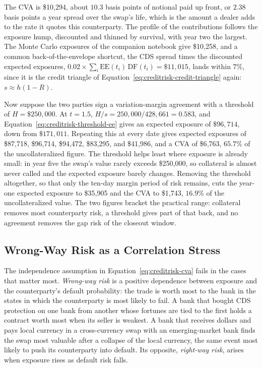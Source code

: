 \documentclass[../ai_in_finance]{subfiles}
\begin{document}
The CVA is \$10{,}294, about $10.3$ basis points of notional paid up front, or $2.38$ basis points a year spread over the swap's life, which is the amount a dealer adds to the rate it quotes this counterparty. The profile of the contributions follows the exposure hump, discounted and thinned by survival, with year two the largest. The Monte Carlo exposures of the companion notebook give \$10{,}258, and a common back-of-the-envelope shortcut, the CDS spread times the discounted expected exposures, $0.02 \times \sum_i \text{EE}(t_i)\,\text{DF}(t_i) = \$11{,}015$, lands within $7\%$, since it is the credit triangle of Equation~\eqref{eq:creditrisk-credit-triangle} again: $s \approx h(1-R)$.

Now suppose the two parties sign a variation-margin agreement with a threshold of $H = \$250{,}000$. At $t=1.5$, $H/s = 250{,}000/428{,}661 = 0.583$, and Equation~\eqref{eq:creditrisk-threshold-ee} gives an expected exposure of $\$96{,}714$, down from $\$171{,}011$. Repeating this at every date gives expected exposures of \$87{,}718, \$96{,}714, \$94{,}472, \$83{,}295, and \$41{,}986, and a CVA of \$6{,}763, $65.7\%$ of the uncollateralized figure. The threshold helps least where exposure is already small: in year five the swap's value rarely exceeds \$250{,}000, so collateral is almost never called and the expected exposure barely changes. Removing the threshold altogether, so that only the ten-day margin period of risk remains, cuts the year-one expected exposure to \$35{,}905 and the CVA to \$1{,}743, $16.9\%$ of the uncollateralized value. The two figures bracket the practical range: collateral removes most counterparty risk, a threshold gives part of that back, and no agreement removes the gap risk of the closeout window.

\subsection{Wrong-Way Risk as a Correlation Stress}
\label{sec:wrong-way-risk}

The independence assumption in Equation~\eqref{eq:creditrisk-cva} fails in the cases that matter most. \emph{Wrong-way risk} is a positive dependence between exposure and the counterparty's default probability: the trade is worth most to the bank in the states in which the counterparty is most likely to fail. A bank that bought CDS protection on one bank from another whose fortunes are tied to the first holds a contract worth most when its seller is weakest. A bank that receives dollars and pays local currency in a cross-currency swap with an emerging-market bank finds the swap most valuable after a collapse of the local currency, the same event most likely to push its counterparty into default. Its opposite, \emph{right-way risk}, arises when exposure rises as default risk falls.
\end{document}
